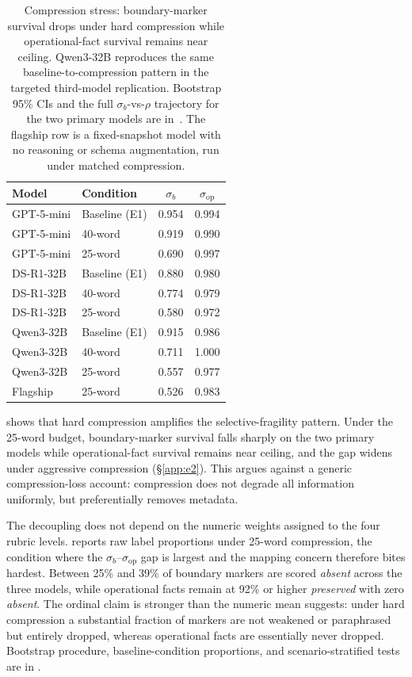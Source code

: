 \begin{table}[!ht]
  \centering
  \small
  \begin{tabular}{@{}llcc@{}}
    \toprule
    \textbf{Model} & \textbf{Condition} & $\sigma_b$ & $\sigma_{\mathrm{op}}$ \\
    \midrule
    GPT-5-mini & Baseline (E1) & 0.954 & 0.994 \\
    GPT-5-mini & 40-word       & 0.919 & 0.990 \\
    GPT-5-mini & 25-word       & 0.690 & 0.997 \\
    DS-R1-32B  & Baseline (E1) & 0.880 & 0.980 \\
    DS-R1-32B  & 40-word       & 0.774 & 0.979 \\
    DS-R1-32B  & 25-word       & 0.580 & 0.972 \\
    Qwen3-32B  & Baseline (E1) & 0.915 & 0.986 \\
    Qwen3-32B  & 40-word       & 0.711 & 1.000 \\
    Qwen3-32B  & 25-word       & 0.557 & 0.977 \\
    \midrule
    Flagship   & 25-word       & 0.526 & 0.983 \\
    \bottomrule
  \end{tabular}
  \caption{Compression stress: boundary-marker survival drops under hard compression while operational-fact survival remains near ceiling. Qwen3-32B reproduces the same baseline-to-compression pattern in the targeted third-model replication. Bootstrap 95\% CIs and the full $\sigma_b$-vs-$\rho$ trajectory for the two primary models are in~. The flagship row is a fixed-snapshot model with no reasoning or schema augmentation, run under matched compression.}
  \label{tab:e2_stress}
\end{table}
 shows that hard compression amplifies the selective-fragility pattern. Under the 25-word budget, boundary-marker survival falls sharply on the two primary models while operational-fact survival remains near ceiling, and the gap widens under aggressive compression (\S\ref{app:e2}). 
This argues against a generic compression-loss account: compression does not degrade all information uniformly, but preferentially removes metadata.

The decoupling does not depend on the numeric weights assigned to the four rubric levels.  reports raw label proportions under 25-word compression, the condition where the $\sigma_b$--$\sigma_{\mathrm{op}}$ gap is largest and the mapping concern therefore bites hardest. Between 25\% and 39\% of boundary markers are scored \emph{absent} across the three models, while operational facts remain at 92\% or higher \emph{preserved} with zero \emph{absent}. The ordinal claim is stronger than the numeric mean suggests: under hard compression a substantial fraction of markers are not weakened or paraphrased but entirely dropped, whereas operational facts are essentially never dropped. Bootstrap procedure, baseline-condition proportions, and scenario-stratified tests are in .

